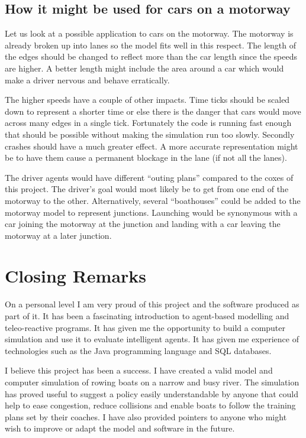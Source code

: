   \subsection{How it might be used for cars on a motorway}
  
  Let us look at a possible application to cars on the motorway. The motorway is already broken up into lanes so the model fits well in this respect. The length of the edges should be changed to reflect more than the car length since the speeds are higher. A better length might include the area around a car which would make a driver nervous and behave erratically. 
  
  The higher speeds have a couple of other impacts. Time ticks should be scaled down to represent a shorter time or else there is the danger that cars would move across many edges in a single tick. Fortunately the code is running fast enough that should be possible without making the simulation run too slowly. Secondly crashes should have a much greater effect. A more accurate representation might be to have them cause a permanent blockage in the lane (if not all the lanes).
  
  The driver agents would have different ``outing plans'' compared to the coxes of this project. The driver's goal would most likely be to get from one end of the motorway to the other. Alternatively, several ``boathouses'' could be added to the motorway model to represent junctions. Launching would be synonymous with a car joining the motorway at the junction and landing with a car leaving the motorway at a later junction.

  \section{Closing Remarks}
  On a personal level I am very proud of this project and the software produced as part of it. It has been a fascinating introduction to agent-based modelling and teleo-reactive programs. It has given me the opportunity to build a computer simulation and use it to evaluate intelligent agents. It has given me experience of technologies such as the Java programming language and SQL databases.
  
  I believe this project has been a success. I have created a valid model and computer simulation of rowing boats on a narrow and busy river. The simulation has proved useful to suggest a policy easily understandable by anyone that could help to ease congestion, reduce collisions and enable boats to follow the training plans set by their coaches. I have also provided pointers to anyone who might wish to improve or adapt the model and software in the future.

  